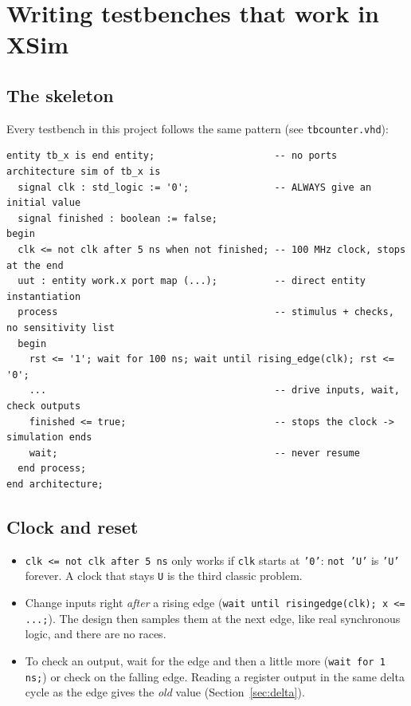 \documentclass[11pt,a4paper]{article}
\newcommand{\code}[1]{\texttt{#1}}
\renewcommand{\_}{\oldunderscore\allowbreak{}}
\begin{document}
\section{Writing testbenches that work in XSim}\label{sec:tb}

\subsection{The skeleton}
Every testbench in this project follows the same pattern (see \code{tb\_counter.vhd}):
\begin{lstlisting}[language=VHDLx]
entity tb_x is end entity;                     -- no ports
architecture sim of tb_x is
  signal clk : std_logic := '0';               -- ALWAYS give an initial value
  signal finished : boolean := false;
begin
  clk <= not clk after 5 ns when not finished; -- 100 MHz clock, stops at the end
  uut : entity work.x port map (...);          -- direct entity instantiation
  process                                      -- stimulus + checks, no sensitivity list
  begin
    rst <= '1'; wait for 100 ns; wait until rising_edge(clk); rst <= '0';
    ...                                        -- drive inputs, wait, check outputs
    finished <= true;                          -- stops the clock -> simulation ends
    wait;                                      -- never resume
  end process;
end architecture;
\end{lstlisting}

\subsection{Clock and reset}
\begin{itemize}[nosep]
  \item \code{clk <= not clk after 5 ns} only works if \code{clk} starts at \code{'0'}: \code{not 'U'} is \code{'U'} forever. A clock that stays \code{U} is the third classic problem.
  \item Change inputs right \emph{after} a rising edge (\code{wait until rising\_edge(clk); x <= ...;}). The design then samples them at the next edge, like real synchronous logic, and there are no races.
  \item To check an output, wait for the edge and then a little more (\code{wait for 1 ns;}) or check on the falling edge. Reading a register output in the same delta cycle as the edge gives the \emph{old} value (Section~\ref{sec:delta}).
\end{itemize}
\end{document}
